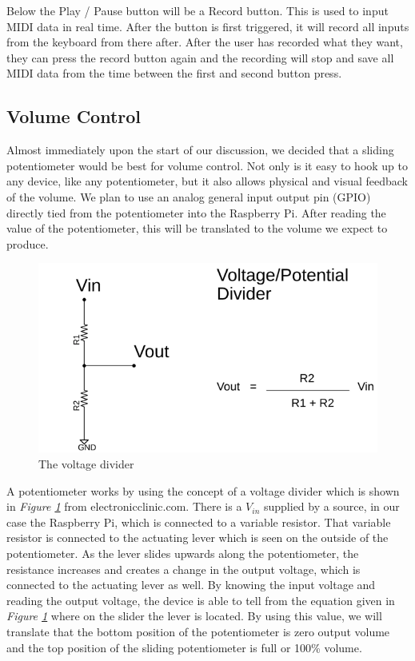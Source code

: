 Below the Play / Pause button will be a Record button. This is used to input MIDI data in real time. After the button is first triggered, it will record all inputs from the keyboard from there after. After the user has recorded what they want, they can press the record button again and the recording will stop and save all MIDI data from the time between the first and second button press.

\subsection{Volume Control}

Almost immediately upon the start of our discussion, we decided that a sliding potentiometer would be best for volume control. Not only is it easy to hook up to any device, like any potentiometer, but it also allows physical and visual feedback of the volume. We plan to use an analog general input output pin (GPIO) directly tied from the potentiometer into the Raspberry Pi. After reading the value of the potentiometer, this will be translated to the volume we expect to produce.

\begin{figure}[h!]
  \centering
  \includegraphics[width=\linewidth]{image/VoltageDiv.png}
  \caption{The voltage divider}
  \label{fig:voltage_div}
\end{figure}

A potentiometer works by using the concept of a voltage divider which is shown in \textit{Figure \ref{fig:voltage_div}} from electronicclinic.com. There is a $ V_{in} $ supplied by a source, in our case the Raspberry Pi, which is connected to a variable resistor. That variable resistor is connected to the actuating lever which is seen on the outside of the potentiometer. As the lever slides upwards along the potentiometer, the resistance increases and creates a change in the output voltage, which is connected to the actuating lever as well. By knowing the input voltage and reading the output voltage, the device is able to tell from the equation given in \textit{Figure \ref{fig:voltage_div}} where on the slider the lever is located. By using this value, we will translate that the bottom position of the potentiometer is zero output volume and the top position of the sliding potentiometer is full or 100\% volume.

